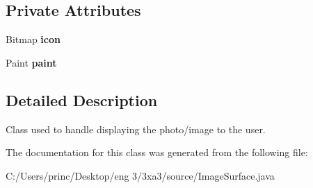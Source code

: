 \subsection*{Private Attributes}
\begin{DoxyCompactItemize}
\item 
\mbox{\label{class_image_surface_ae4be69b0b57a914f8e2917f35402689a}} 
Bitmap {\bfseries icon}
\item 
\mbox{\label{class_image_surface_adb357fc2130adc45e7822f041c20ff2b}} 
Paint {\bfseries paint}
\end{DoxyCompactItemize}


\subsection{Detailed Description}
Class used to handle displaying the photo/image to the user. 

The documentation for this class was generated from the following file\+:\begin{DoxyCompactItemize}
\item 
C\+:/\+Users/princ/\+Desktop/eng 3/3xa3/source/Image\+Surface.\+java\end{DoxyCompactItemize}
